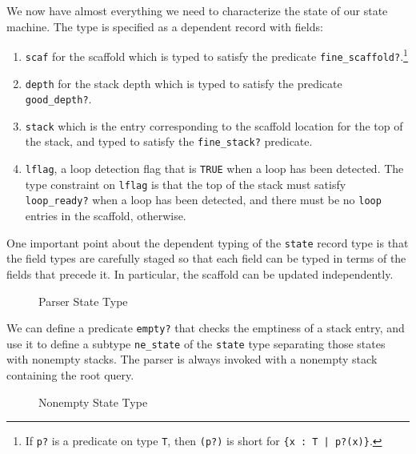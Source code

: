 \documentclass[sigplan,10pt,anonymous,review]{acmart}\settopmatter{printfolios=true,printccs=false,printacmref=false}
\begin{document}
\begin{CCSXML}
We now have almost everything we need to characterize the state of our
state machine.  The type is specified as a dependent record with fields:
\begin{enumerate}
\item \texttt{scaf} for the scaffold which is typed to satisfy the predicate \texttt{fine\_scaffold?}.\footnote{If \texttt{p?} is a predicate on type \texttt{T}, then \texttt{(p?)} is short for \texttt{\{x : T | p?(x)\}}.}
\item \texttt{depth} for the stack depth which is typed to satisfy the predicate \texttt{good\_depth?}.
\item \texttt{stack} which is the entry corresponding to the scaffold location for
  the top of the stack, and typed to satisfy the \texttt{fine\_stack?} predicate.
\item \texttt{lflag}, a loop detection flag that is \texttt{TRUE} when a loop has been detected.  The type constraint on \texttt{lflag} is that the top of the stack must satisfy \texttt{loop\_ready?} when a loop has been detected, and there must be no \texttt{loop} entries in the scaffold, otherwise.  
\end{enumerate}
One important point about the dependent typing of the \texttt{state} record type
is that the field types are carefully staged so that each field can be typed 
in terms of the fields that precede it.  In particular, the scaffold can be updated independently.  
\begin{figure}[h!]
  
    \vspace*{-4mm}
\caption{Parser State Type}
\label{pvs:state}
\end{figure}

We can define a predicate \texttt{empty?} that checks the emptiness of a stack
entry, and use it to define a subtype \texttt{ne\_state} of the \texttt{state}
type separating those states with nonempty stacks.  The parser is always invoked with a nonempty stack containing the root query.  
\begin{figure}[h!]
  
    \vspace*{-4mm}
\caption{Nonempty State Type}
\label{pvs:empty}
\end{figure}


\end{CCSXML}
\end{document}
